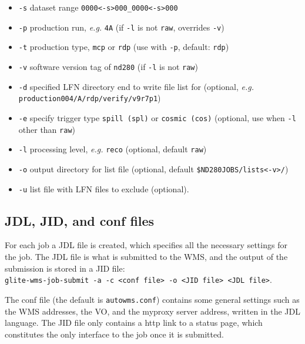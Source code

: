 \documentclass[11pt]{article}
\begin{document}
\begin{itemize}
\item \verb+-s+ dataset range \verb+0000<-s>000_0000<-s>000+
\item \verb+-p+ production run, \textit{e.g.} \verb+4A+ (if \verb+-l+ is not \verb+raw+, overrides \verb+-v+)
\item \verb+-t+ production type, \verb+mcp+ or \verb+rdp+ (use with \verb+-p+, default: \verb+rdp+)
\item \verb+-v+ software version tag of \verb+nd280+ (if \verb+-l+ is not \verb+raw+)
\item \verb+-d+ specified LFN directory end to write file list for (optional, \textit{e.g.} \verb+production004/A/rdp/verify/v9r7p1+)
\item \verb+-e+ specify trigger type \verb+spill (spl)+ or \verb+cosmic (cos)+ (optional, use when \verb+-l+ other than \verb+raw+)
\item \verb+-l+ processing level, \textit{e.g.} \verb+reco+ (optional, default \verb+raw+)
\item \verb+-o+ output directory for list file (optional, default \verb+$ND280JOBS/lists<-v>/+)
\item \verb+-u+ list file with LFN files to exclude (optional).
\end{itemize}

\subsection{JDL, JID, and conf files}
For each job a JDL file is created, which specifies all the necessary
settings for the job. The JDL file is what is submitted to the WMS,
and the output of the submission is stored in a JID file:\\
\verb+glite-wms-job-submit -a -c <conf file> -o <JID file> <JDL file>+.

The conf file (the default is \verb+autowms.conf+) contains some
general settings such as the WMS addresses, the VO, and the myproxy
server address, written in the JDL language. The JID file only
contains a http link to a status page, which constitutes the only
interface to the job once it is submitted.
\end{document}
